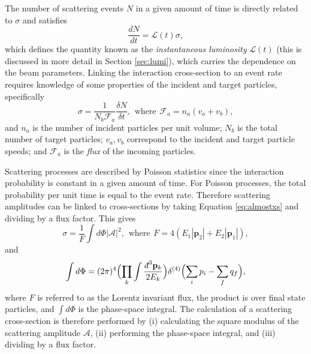 The number of scattering events $N$ in a given amount of time is directly related to $\sigma$ and satisfies
\begin{equation}\label{eq:instlumi}
    \frac{dN}{dt}=\mathcal{L}(t)\sigma,
\end{equation}
which defines the quantity known as the \textit{instantaneous luminosity} $\mathcal{L}(t)$ (this is discussed in more detail in Section \ref{sec:lumi}), which carries the dependence on the beam parameters. Linking the interaction cross-section to an event rate requires knowledge of some properties of the incident and target particles, specifically
\begin{equation}\label{eq:xsection}
    \sigma=\frac{1}{N_b\mathcal{F}_a}\frac{\delta N}{\delta t},\hspace{5pt}\text{where}\hspace{5pt}\mathcal{F}_a=n_a(v_a+v_b),
\end{equation}
and $n_a$ is the number of incident particles per unit volume; $N_b$ is the total number of target particles; $v_a,v_b$ correspond to the incident and target particle speeds; and $\mathcal{F}_a$ is the \textit{flux} of the incoming particles.

Scattering processes are described by Poisson statistics since the interaction probability is constant in a given amount of time. For Poisson processes, the total probability per unit time is equal to the event rate. Therefore scattering amplitudes can be linked to cross-sections by taking Equation \ref{eq:almostxs} and dividing by a flux factor. This gives
\begin{equation}
    \sigma=\frac{1}{F}\int d\Phi|\mathcal{A}|^2,\hspace{5pt}\text{where}\hspace{5pt}F=4(E_1|\mathbf{p}_2|+E_2|\mathbf{p}_1|),
\end{equation}
and 
\begin{equation}
    \int d\Phi=(2\pi)^4\Bigl(\prod_k\int\frac{\dbar^3\mathbf{p}_k}{2E_k}\Bigr)\delta^{(4)}\Bigl(\sum_ip_i-\sum_fq_f\Bigr),
\end{equation}
where $F$ is referred to as the Lorentz invariant flux, the product is over final state particles, and $\int d\Phi$ is the phase-space integral.
The calculation of a scattering cross-section is therefore performed by (i) calculating the square modulus of the scattering amplitude $\mathcal{A}$, (ii) performing the phase-space integral, and (iii) dividing by a flux factor. 

